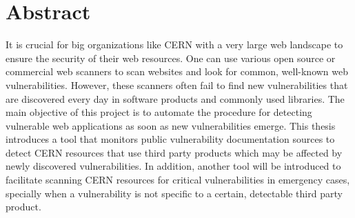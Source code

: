 \chapter*{Abstract}

It is crucial for big organizations like CERN with a very large web landscape to ensure the security of their web resources. One can use various open source or commercial web scanners to scan websites and look for common, well-known web vulnerabilities. However, these scanners often fail to find new vulnerabilities that are discovered every day in software products and commonly used libraries. The main objective of this project is to automate the procedure for detecting vulnerable web applications as soon as new vulnerabilities emerge. This thesis introduces a tool that monitors public vulnerability documentation sources to detect CERN resources that use third party products which may be affected by newly discovered vulnerabilities. In addition, another tool will be introduced to facilitate scanning CERN resources for critical vulnerabilities in emergency cases, specially when a vulnerability is not specific to a certain, detectable third party product.